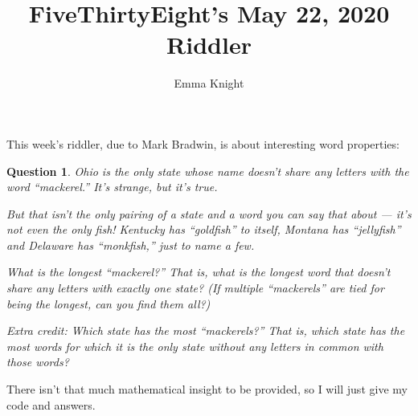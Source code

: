 \documentclass[11pt]{article}
\title{FiveThirtyEight's May 22, 2020 Riddler}
\author{Emma Knight}
\newtheorem{question}[theorem]{Question}
\theoremstyle{definition}
\begin{document}
\maketitle
This week's riddler, due to Mark Bradwin, is about interesting word properties:
\begin{question}
Ohio is the only state whose name doesn't share any letters with the word ``mackerel.'' It's strange, but it's true.

But that isn't the only pairing of a state and a word you can say that about — it's not even the only fish! Kentucky has ``goldfish'' to itself, Montana has ``jellyfish'' and Delaware has ``monkfish,'' just to name a few.

What is the longest ``mackerel?'' That is, what is the longest word that doesn't share any letters with exactly one state? (If multiple ``mackerels'' are tied for being the longest, can you find them all?)

Extra credit: Which state has the most ``mackerels?'' That is, which state has the most words for which it is the only state without any letters in common with those words?
\end{question}
There isn't that much mathematical insight to be provided, so I will just give my code and answers.
\end{document}
